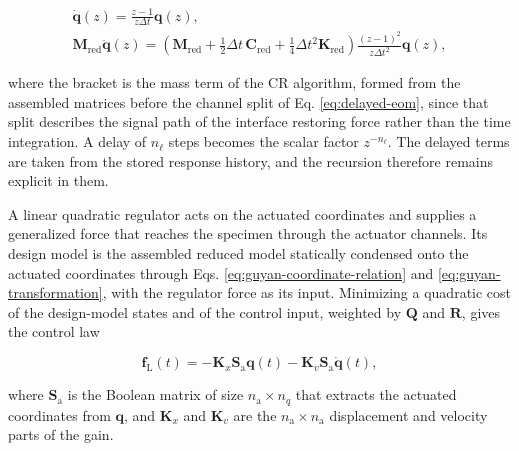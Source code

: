 \documentclass[a4paper,fleqn,review,12pt]{cas-sc}
\numberwithin{equation}{section}
\begin{document}
\vspace{-3.5em}
\begin{equation}
	\begin{gathered}
		\dot{\bm{q}}(z)=\frac{z-1}{z\Delta t}\bm{q}(z),\\
		\mathbf{M}_{\mathrm{red}}\ddot{\bm{q}}(z)=
		\left(\mathbf{M}_{\mathrm{red}}
		+\tfrac{1}{2}\Delta t\,\mathbf{C}_{\mathrm{red}}
		+\tfrac{1}{4}\Delta t^{2}\mathbf{K}_{\mathrm{red}}\right)
		\frac{(z-1)^{2}}{z\Delta t^{2}}\bm{q}(z),
	\end{gathered}
	\label{eq:z-derivatives}
\end{equation}
\vspace{-3.5em}

\noindent where the bracket is the mass term of the CR algorithm, formed from the assembled matrices before the channel split of Eq. \eqref{eq:delayed-eom}, since that split describes the signal path of the interface restoring force rather than the time integration. A delay of \(n_{\ell}\) steps becomes the scalar factor \(z^{-n_{\ell}}\). The delayed terms are taken from the stored response history, and the recursion therefore remains explicit in them.

A linear quadratic regulator acts on the actuated coordinates and supplies a generalized force that reaches the specimen through the actuator channels. Its design model is the assembled reduced model statically condensed onto the actuated coordinates through Eqs. \eqref{eq:guyan-coordinate-relation} and \eqref{eq:guyan-transformation}, with the regulator force as its input. Minimizing a quadratic cost of the design-model states and of the control input, weighted by \(\mathbf{Q}\) and \(\mathbf{R}\), gives the control law

\vspace{-3.5em}
\begin{equation}
	\bm{f}_{\mathrm{L}}(t)=
	-\mathbf{K}_{x}\mathbf{S}_{\mathrm{a}}\bm{q}(t)
	-\mathbf{K}_{v}\mathbf{S}_{\mathrm{a}}\dot{\bm{q}}(t),
	\label{eq:lqr-law}
\end{equation}
\vspace{-3.5em}

\noindent where \(\mathbf{S}_{\mathrm{a}}\) is the Boolean matrix of size \(n_{\mathrm{a}}\times n_{q}\) that extracts the actuated coordinates from \(\bm{q}\), and \(\mathbf{K}_{x}\) and \(\mathbf{K}_{v}\) are the \(n_{\mathrm{a}}\times n_{\mathrm{a}}\) displacement and velocity parts of the gain.
\end{document}
